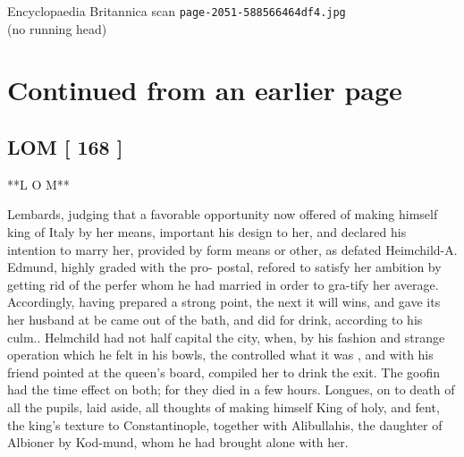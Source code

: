 \documentclass{article}
\begin{document}
\begin{center}
{\Large Encyclopaedia Britannica scan \texttt{page-2051-588566464df4.jpg}}\\[0.5em]
(no running head)
\end{center}
\section*{Continued from an earlier page}
\subsection*{LOM [ 168 ]}
**L O M**

Lembards, judging that a favorable opportunity now offered of making himself king of Italy by her means, important his design to her, and declared his intention to marry her, provided by form means or other, as defated Heimchild-A. Edmund, highly graded with the pro- postal, refored to satisfy her ambition by getting rid of the perfer whom he had married in order to gra-tify her average. Accordingly, having prepared a strong point, the next it will wins, and gave its her husband at be came out of the bath, and did for drink, according to his culm.. Helmchild had not half capital the city, when, by his fashion and strange operation which he felt in his bowls, the controlled what it was , and with his friend pointed at the queen’s board, compiled her to drink the exit. The goofin had the time effect on both; for they died in a few hours. Longues, on to death of all the pupils, laid aside, all thoughts of making himself King of holy, and fent, the king’s texture to Constantinople, together with Alibullahis, the daughter of Albioner by Kod-mund, whom he had brought alone with her.
\end{document}
